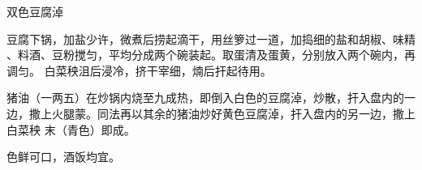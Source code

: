 \begin{recipe}[鸳鸯豆腐淖]{双色豆腐淖}

\ingredients


\preparation

\step 豆腐下锅，加盐少许，微煮后捞起滴干，用丝箩过一道，加捣细的盐和胡椒、味精
、料酒、豆粉搅匀，平均分成两个碗装起。取蛋清及蛋黄，分别放入两个碗内，再调匀。
白菜秧沮后浸冷，挤干宰细，煵后扞起待用。

\step 猪油（一两五）在炒锅内烧至九成热，即倒入白色的豆腐淖，炒散，扞入盘内的一
边，撒上火腿蒙。同法再以其余的猪油炒好黄色豆腐淖，扞入盘内的另一边，撒上白菜秧
末（青色）即成。

\features

色鲜可口，酒饭均宜。

\end{recipe}

